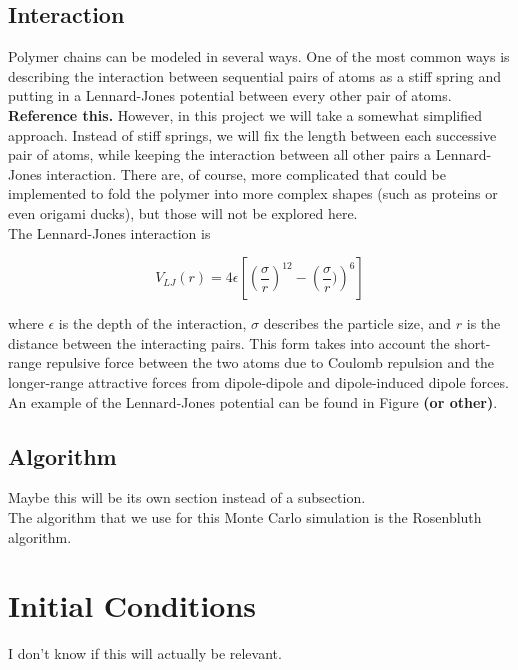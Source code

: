 \documentclass{article}
\begin{document}
\begin{multicols}{2}
\subsection{Interaction}

Polymer chains can be modeled in several ways.  One of the most common ways is describing the interaction between sequential pairs of atoms as a stiff spring and putting in a Lennard-Jones potential between every other pair of atoms.  \textbf{Reference this.}  However, in this project we will take a somewhat simplified approach.  Instead of stiff springs, we will fix the length between each successive pair of atoms, while keeping the interaction between all other pairs a Lennard-Jones interaction.  There are, of course, more complicated that could be implemented to fold the polymer into more complex shapes (such as proteins or even origami ducks), but those will not be explored here.\\

The Lennard-Jones interaction is 

\begin{equation}
V_{LJ}(r) = 4\epsilon \left [ \left ( \frac{\sigma}{r} \right ) ^{12} - \left ( \frac{\sigma}{r}) \right ) ^6 \right ]
\end{equation}

\noindent where $\epsilon$ is the depth of the interaction, $\sigma$ describes the particle size, and $r$ is the distance between the interacting pairs.  This form takes into account the short-range repulsive force between the two atoms due to Coulomb repulsion and the longer-range attractive forces from dipole-dipole and dipole-induced dipole forces.  An example of the Lennard-Jones potential can be found in Figure \textbf{(or other)}.

\subsection{Algorithm}

Maybe this will be its own section instead of a subsection.\\

The algorithm that we use for this Monte Carlo simulation is the Rosenbluth algorithm.  

\section{Initial Conditions}
\label{IC}

I don't know if this will actually be relevant.  


\end{multicols}
\end{document}
